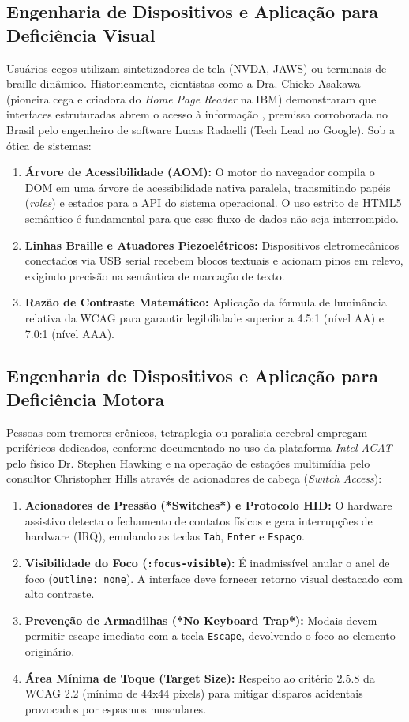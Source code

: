 \documentclass[12pt,a4paper]{article}
\begin{document}
\subsection{Engenharia de Dispositivos e Aplicação para Deficiência Visual}
Usuários cegos utilizam sintetizadores de tela (NVDA, JAWS) ou terminais de braille dinâmico. Historicamente, cientistas como a Dra. Chieko Asakawa (pioneira cega e criadora do \textit{Home Page Reader} na IBM) demonstraram que interfaces estruturadas abrem o acesso à informação \cite{asakawa1997}, premissa corroborada no Brasil pelo engenheiro de software Lucas Radaelli (Tech Lead no Google). Sob a ótica de sistemas:
\begin{enumerate}
    \item \textbf{Árvore de Acessibilidade (AOM):} O motor do navegador compila o DOM em uma árvore de acessibilidade nativa paralela, transmitindo papéis (\textit{roles}) e estados para a API do sistema operacional. O uso estrito de HTML5 semântico é fundamental para que esse fluxo de dados não seja interrompido.
    \item \textbf{Linhas Braille e Atuadores Piezoelétricos:} Dispositivos eletromecânicos conectados via USB serial recebem blocos textuais e acionam pinos em relevo, exigindo precisão na semântica de marcação de texto.
    \item \textbf{Razão de Contraste Matemático:} Aplicação da fórmula de luminância relativa da WCAG para garantir legibilidade superior a 4.5:1 (nível AA) e 7.0:1 (nível AAA).
\end{enumerate}

\subsection{Engenharia de Dispositivos e Aplicação para Deficiência Motora}
Pessoas com tremores crônicos, tetraplegia ou paralisia cerebral empregam periféricos dedicados, conforme documentado no uso da plataforma \textit{Intel ACAT} pelo físico Dr. Stephen Hawking \cite{intel_acat} e na operação de estações multimídia pelo consultor Christopher Hills através de acionadores de cabeça (\textit{Switch Access}):
\begin{enumerate}
    \item \textbf{Acionadores de Pressão (*Switches*) e Protocolo HID:} O hardware assistivo detecta o fechamento de contatos físicos e gera interrupções de hardware (IRQ), emulando as teclas \texttt{Tab}, \texttt{Enter} e \texttt{Espaço}.
    \item \textbf{Visibilidade do Foco (\texttt{:focus-visible}):} É inadmissível anular o anel de foco (\texttt{outline: none}). A interface deve fornecer retorno visual destacado com alto contraste.
    \item \textbf{Prevenção de Armadilhas (*No Keyboard Trap*):} Modais devem permitir escape imediato com a tecla \texttt{Escape}, devolvendo o foco ao elemento originário.
    \item \textbf{Área Mínima de Toque (Target Size):} Respeito ao critério 2.5.8 da WCAG 2.2 (mínimo de 44x44 pixels) para mitigar disparos acidentais provocados por espasmos musculares.
\end{enumerate}
\end{document}
